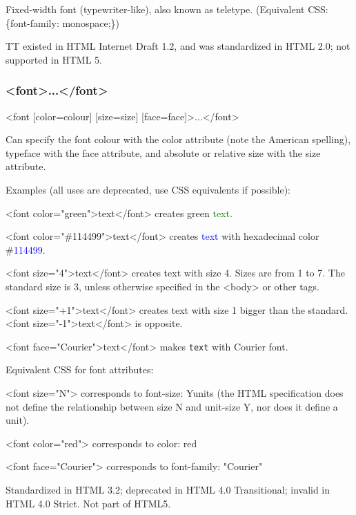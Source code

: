 Fixed-width font (typewriter-like), also known as teletype. (Equivalent CSS: \{font-family: monospace;\})


TT existed in HTML Internet Draft 1.2, and was standardized in HTML 2.0; not supported in HTML 5.


\subsubsection{<font>...</font>}


<font [color=colour] [size=size] [face=face]>...</font>

Can specify the font colour with the color attribute (note the American spelling), typeface with the face attribute, and absolute or relative size with the size attribute.

Examples (all uses are deprecated, use CSS equivalents if possible):

\begin{compactitem}
\item <font color="green">text</font> creates green \textcolor{Green}{text}.
\item <font color="\#114499">text</font> creates \textcolor{Blue}{text} with hexadecimal color \#\textcolor{Blue}{114499}.
\item <font size="4">text</font> creates {\Large{text}} with size 4. Sizes are from 1 to 7. The standard size is 3, unless otherwise specified in the <body> or other tags.
\item <font size="+1">text</font> creates {\large{text with size 1 bigger than the standard}}. <font size="-1">text</font> is {\small{opposite}}.
\item <font face="Courier">text</font> makes \texttt{text} with Courier font.
\end{compactitem}

Equivalent CSS for font attributes:

\begin{compactitem}
\item <font size="N"> corresponds to {font-size: Yunits} (the HTML specification does not define the relationship between size N and unit-size Y, nor does it define a unit).
\item <font color="red"> corresponds to {color: red}
\item <font face="Courier"> corresponds to {font-family: "Courier"}
\end{compactitem}

Standardized in HTML 3.2; deprecated in HTML 4.0 Transitional; invalid in HTML 4.0 Strict. Not part of HTML5.



